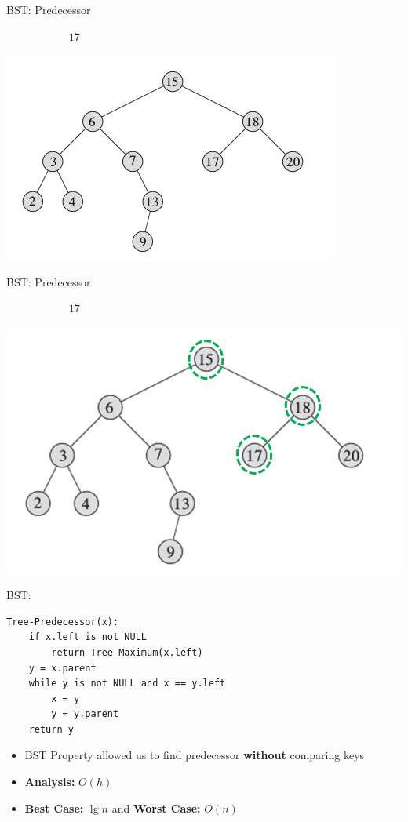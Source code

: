 \documentclass{beamer}
\newcommand{\tblue}[1]{{\Large {\textcolor{azure}{#1}}}}
\begin{document}
\begin{frame}{BST: Predecessor}

\tblue{Predecessor:} $17$
    \begin{center}
        \includegraphics[scale=0.7]{bstSearch.png}
    \end{center}
\end{frame}


\begin{frame}{BST: Predecessor}

\tblue{Predecessor:} $17$
    \begin{center}
        \includegraphics[scale=0.5]{bstPredecessor4.png}
    \end{center}
\end{frame}


\begin{frame}[fragile]{BST: }
\begin{verbatim}
Tree-Predecessor(x):
    if x.left is not NULL
        return Tree-Maximum(x.left)
    y = x.parent
    while y is not NULL and x == y.left
        x = y
        y = y.parent
    return y
\end{verbatim}
    \begin{itemize}
        \item BST Property allowed us to find predecessor {\bf without} comparing keys
        \item {\bf Analysis:} $O(h)$ 
        \item {\bf Best Case:} $\lg n$ and {\bf Worst Case:} $O(n)$
    \end{itemize}
\end{frame}
\end{document}
